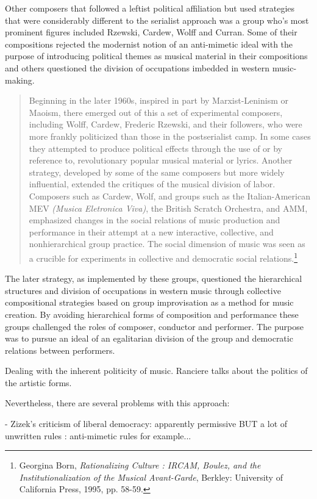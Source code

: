 Other composers that followed a leftist political affiliation but used strategies that were considerably different to the serialist approach was a group who's most prominent figures included Rzewski, Cardew, Wolff and Curran. Some of their compositions rejected the modernist notion of an anti-mimetic ideal with the purpose of introducing political themes as musical material in their compositions and others questioned the division of occupations imbedded in western music-making.

\begin{quote}
Beginning in the later 1960s, inspired in part by Marxist-Leninism or Maoism, there emerged out of this a set of experimental composers, including Wolff, Cardew, Frederic Rzewski, and their followers, who were more frankly politicized than those in the postserialist camp. In some cases they attempted to produce political effects through the use of or by reference to, revolutionary popular musical material or lyrics. Another strategy, developed by some of the same composers but more widely influential, extended the critiques of the musical division of labor. Composers such as Cardew, Wolf, and groups such as the Italian-American MEV \emph{(Musica Eletronica Viva)}, the British Scratch Orchestra, and AMM, emphasized changes in the social relations of music production and performance in their attempt at a new interactive, collective, and nonhierarchical group practice. The social dimension of music was seen as a crucible for experiments in collective and democratic social relations.\footnote{Georgina Born, \emph{Rationalizing Culture : IRCAM, Boulez, and the Institutionalization of the Musical Avant-Garde}, Berkley: University of California Press, 1995, pp. 58-59.}
\end{quote}
The later strategy, as implemented by these groups, questioned the hierarchical structures and division of occupations in western music through collective compositional strategies based on group improvisation as a method for music creation. By avoiding hierarchical forms of composition and performance these groups challenged the roles of composer, conductor and performer. The purpose was to pursue an ideal of an egalitarian division of the group and democratic relations between performers.

Dealing with the inherent politicity of music. Ranciere talks about the politics of the artistic forms.

Nevertheless, there are several problems with this approach:

- Zizek's criticism of liberal democracy: apparently permissive BUT a lot of unwritten rules : anti-mimetic rules for example...

